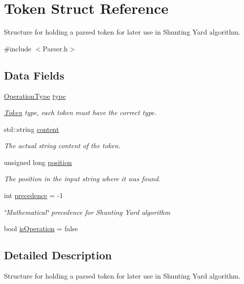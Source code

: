 \hypertarget{structToken}{}\section{Token Struct Reference}
\label{structToken}


Structure for holding a parsed token for later use in Shunting Yard algorithm.  




{\ttfamily \#include $<$Parser.\+h$>$}

\subsection*{Data Fields}
\begin{DoxyCompactItemize}
\item 
\hyperlink{Parser_8h_a9a2c9c31d675b34f6ec35cc1ca89e047}{Operation\+Type} \hyperlink{structToken_a789b6f0ef869794e8edeaff2d1f67cc5}{type}
\begin{DoxyCompactList}\small\item\em \hyperlink{structToken}{Token} type, each token must have the correct type. \end{DoxyCompactList}\item 
std\+::string \hyperlink{structToken_a0e29f6b35c314683c1a4729eb0d08739}{content}
\begin{DoxyCompactList}\small\item\em The actual string content of the token. \end{DoxyCompactList}\item 
unsigned long \hyperlink{structToken_ab8ddfabb4f48684b2ff8620948e12fcc}{position}
\begin{DoxyCompactList}\small\item\em The position in the input string where it was found. \end{DoxyCompactList}\item 
int \hyperlink{structToken_adafb834c6a6e9e4ce4b0bf709f0b2bac}{precedence} = -\/1
\begin{DoxyCompactList}\small\item\em \char`\"{}\+Mathematical\char`\"{} precedence for Shunting Yard algorithm \end{DoxyCompactList}\item 
bool \hyperlink{structToken_a123afb499b20188ef2af42ff6b7d6591}{is\+Operation} = false
\end{DoxyCompactItemize}


\subsection{Detailed Description}
Structure for holding a parsed token for later use in Shunting Yard algorithm. 

